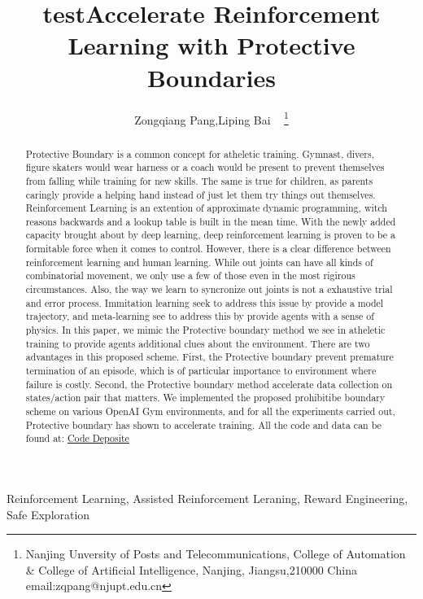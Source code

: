 \documentclass[journal]{IEEEtran}
\begin{document}
    \title{test}
\title{Accelerate Reinforcement Learning with Protective Boundaries}

\author{ Zongqiang Pang,Liping Bai ~ \thanks{Nanjing Unversity of Posts and Telecommunications, College of Automation \& College of Artificial Intelligence, Nanjing, Jiangsu,210000 China email:zqpang@njupt.edu.cn}}
\maketitle
\begin{abstract}
Protective Boundary is a common concept for atheletic training. Gymnast, divers, figure skaters would wear harness or a coach would be present to prevent themselves from falling while training for new skills. The same is true for children, as parents caringly provide a helping hand instead of just let them try things out themselves. Reinforcement Learning is an extention of approximate dynamic programming, witch reasons backwards and a lookup table is built in the mean time. With the newly added capacity brought about by deep learning, deep reinforcement learning is proven to be a formitable force when it comes to control. However, there is a clear difference between reinforcement learning and human learning. While out joints can have all kinds of combinatorial movement, we only use a few of those even in the most rigirous circumstances. Also, the way we learn to syncronize out joints is not a exhaustive trial and error process. Immitation learning seek to address this issue by provide a model trajectory, and meta-learning see to address this by provide agents with a sense of physics. In this paper, we mimic the Protective boundary method we see in atheletic training to provide agents additional clues about the environment. There are two advantages in this proposed scheme. First, the Protective boundary prevent premature termination of an episode, which is of particular importance to environment where failure is costly. Second, the Protective boundary method accelerate data collection on states/action pair that matters. We implemented the proposed prohibitibe boundary scheme on various OpenAI Gym environments, and for all the experiments carried out, Protective boundary has shown to accelerate training. All the code and data can be found at: \href{https://github.com/BaiLiping/Protective_Boundary}{Code Deposite}
\end{abstract}
\begin{IEEEkeywords}
Reinforcement Learning, Assisted Reinforcement Leraning, Reward Engineering, Safe Exploration
\end{IEEEkeywords}
\IEEEpeerreviewmaketitle
\end{document}
